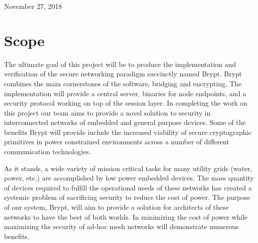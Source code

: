 \documentclass[tikz,a4paper,titlepage]{article}
\begin{document}
\begin{titlepage}

{\large November 27, 2018}\\[3cm] %




\vfill %

\end{titlepage}

\tableofcontents
\newpage

\section{Scope}

The ultimate goal of this project will be to produce the implementation and verification of the secure networking paradigm succinctly named Brypt. Brypt combines the main cornerstones of the software, bridging and encrypting. The implementation will provide a central server, binaries for node endpoints, and a security protocol working on top of the session layer. In completing the work on this project our team aims to provide a novel solution to security in interconnected networks of embedded and general purpose devices. Some of the benefits Brypt will provide include the increased viability of secure cryptographic primitives in power constrained environments across a number of different communication technologies. 

As it stands, a wide variety of mission critical tasks for many utility grids (water, power, etc.) are accomplished by low power embedded devices. The mass quantity of devices required to fulfill the operational needs of these networks has created a systemic problem of sacrificing security to reduce the cost of power. The purpose of our system, Brypt, will aim to provide a solution for architects of these networks to have the best of both worlds. In minimizing the cost of power while maximizing the security of ad-hoc mesh networks will demonstrate numerous benefits.
\end{document}

